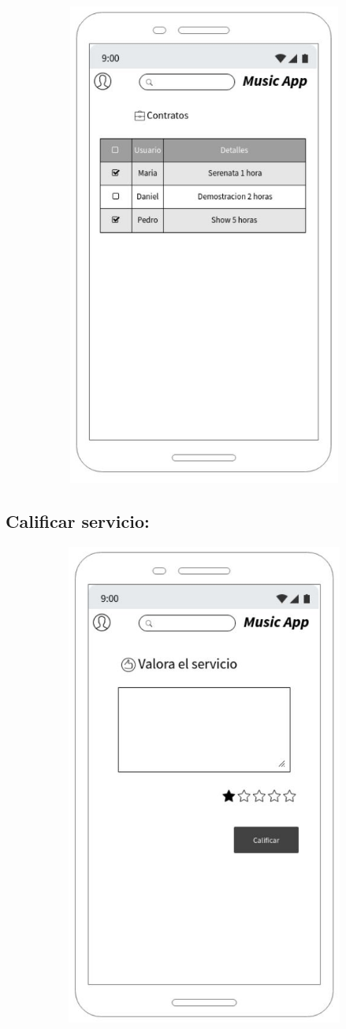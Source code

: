 \begin{figure}[hbt!]
 \centering
\includegraphics[width=12cm, height=16cm,keepaspectratio=true]{Desarrollo/Interfaces/Mockup/imgs/wire6.JPG}
\end{figure}
\newpage
\subsection{Calificar servicio:}

\begin{figure}[hbt!]
 \centering
\includegraphics[width=12cm, height=16cm,keepaspectratio=true]{Desarrollo/Interfaces/Mockup/imgs/wire7.JPG}
\end{figure}